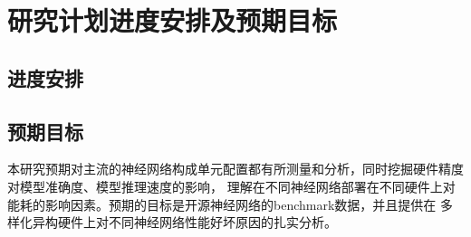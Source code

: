 \section{研究计划进度安排及预期目标}

\subsection{进度安排}

\subsection{预期目标}

本研究预期对主流的神经网络构成单元配置都有所测量和分析，同时挖掘硬件精度对模型准确度、模型推理速度的影响，
理解在不同神经网络部署在不同硬件上对能耗的影响因素。预期的目标是开源神经网络的benchmark数据，并且提供在
多样化异构硬件上对不同神经网络性能好坏原因的扎实分析。